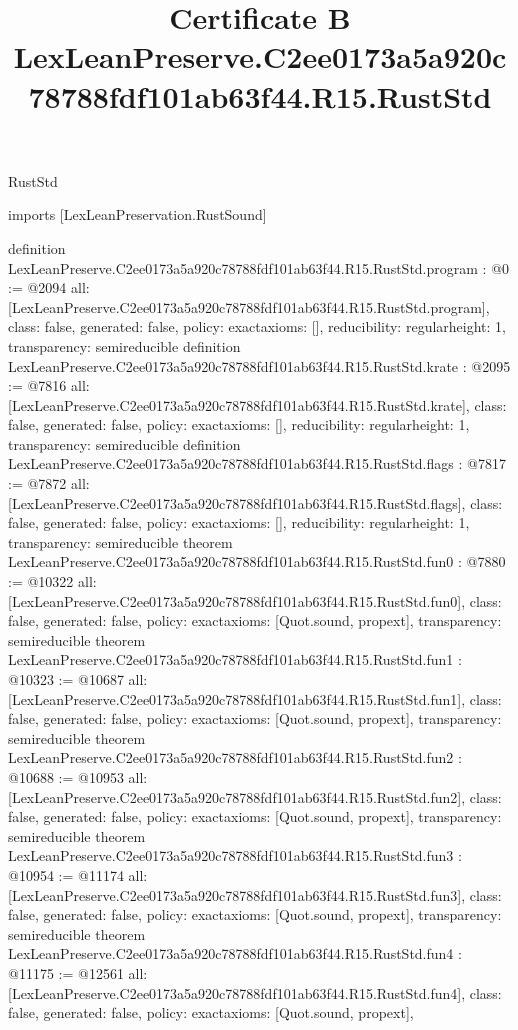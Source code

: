 \begin{lexlean}{RustStd}
\title{Certificate B LexLeanPreserve.C2ee0173a5a920c78788fdf101ab63f44.R15.RustStd}
\begin{coremodule}
imports [LexLeanPreservation.RustSound]

definition LexLeanPreserve.C2ee0173a5a920c78788fdf101ab63f44.R15.RustStd.program : @0 := @2094 {
  all: [LexLeanPreserve.C2ee0173a5a920c78788fdf101ab63f44.R15.RustStd.program],
  class: false,
  generated: false,
  policy: exact{axioms: []},
  reducibility: regular{height: 1},
  transparency: semireducible
}
definition LexLeanPreserve.C2ee0173a5a920c78788fdf101ab63f44.R15.RustStd.krate : @2095 := @7816 {
  all: [LexLeanPreserve.C2ee0173a5a920c78788fdf101ab63f44.R15.RustStd.krate],
  class: false,
  generated: false,
  policy: exact{axioms: []},
  reducibility: regular{height: 1},
  transparency: semireducible
}
definition LexLeanPreserve.C2ee0173a5a920c78788fdf101ab63f44.R15.RustStd.flags : @7817 := @7872 {
  all: [LexLeanPreserve.C2ee0173a5a920c78788fdf101ab63f44.R15.RustStd.flags],
  class: false,
  generated: false,
  policy: exact{axioms: []},
  reducibility: regular{height: 1},
  transparency: semireducible
}
theorem LexLeanPreserve.C2ee0173a5a920c78788fdf101ab63f44.R15.RustStd.fun0 : @7880 := @10322 {
  all: [LexLeanPreserve.C2ee0173a5a920c78788fdf101ab63f44.R15.RustStd.fun0],
  class: false,
  generated: false,
  policy: exact{axioms: [Quot.sound, propext]},
  transparency: semireducible
}
theorem LexLeanPreserve.C2ee0173a5a920c78788fdf101ab63f44.R15.RustStd.fun1 : @10323 := @10687 {
  all: [LexLeanPreserve.C2ee0173a5a920c78788fdf101ab63f44.R15.RustStd.fun1],
  class: false,
  generated: false,
  policy: exact{axioms: [Quot.sound, propext]},
  transparency: semireducible
}
theorem LexLeanPreserve.C2ee0173a5a920c78788fdf101ab63f44.R15.RustStd.fun2 : @10688 := @10953 {
  all: [LexLeanPreserve.C2ee0173a5a920c78788fdf101ab63f44.R15.RustStd.fun2],
  class: false,
  generated: false,
  policy: exact{axioms: [Quot.sound, propext]},
  transparency: semireducible
}
theorem LexLeanPreserve.C2ee0173a5a920c78788fdf101ab63f44.R15.RustStd.fun3 : @10954 := @11174 {
  all: [LexLeanPreserve.C2ee0173a5a920c78788fdf101ab63f44.R15.RustStd.fun3],
  class: false,
  generated: false,
  policy: exact{axioms: [Quot.sound, propext]},
  transparency: semireducible
}
theorem LexLeanPreserve.C2ee0173a5a920c78788fdf101ab63f44.R15.RustStd.fun4 : @11175 := @12561 {
  all: [LexLeanPreserve.C2ee0173a5a920c78788fdf101ab63f44.R15.RustStd.fun4],
  class: false,
  generated: false,
  policy: exact{axioms: [Quot.sound, propext]},
}
\end{coremodule}
\end{lexlean}
